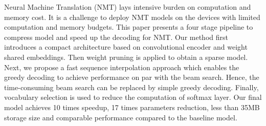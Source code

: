 Neural Machine Translation (NMT) lays intensive burden on computation and memory cost. It is a challenge to deploy NMT models on the devices with limited computation and memory budgets. This paper presents a four stage pipeline to compress model and speed up the decoding for NMT. Our method first introduces a compact architecture based on convolutional encoder and weight shared embeddings. Then weight pruning is applied to obtain a sparse model. Next, we propose a fast sequence interpolation approach which enables the greedy decoding to achieve performance on par with the beam search. Hence, the time-consuming beam search can be replaced by simple greedy decoding. Finally, vocabulary selection is used to reduce the computation of softmax layer. Our final model achieves 10 times speedup, 17 times parameters reduction, less than 35MB storage size and comparable performance compared to the baseline model.
